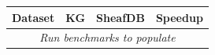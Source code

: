 \begin{tabular}{@{}lccc@{}}
\toprule
Dataset & KG & SheafDB & Speedup \\
\midrule
\multicolumn{4}{c}{\emph{Run benchmarks to populate}} \\
\bottomrule
\end{tabular}
